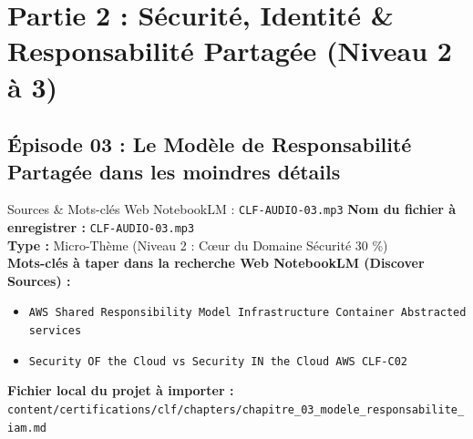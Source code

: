 \documentclass[11pt,a4paper]{article}
\begin{document}
\newpage

\section{Partie 2 : Sécurité, Identité \& Responsabilité Partagée (Niveau 2 à 3)}

\subsection{Épisode 03 : Le Modèle de Responsabilité Partagée dans les moindres détails}
\begin{sourcebox}{Sources \& Mots-clés Web NotebookLM : \texttt{CLF-AUDIO-03.mp3}}
\textbf{Nom du fichier à enregistrer :} \texttt{CLF-AUDIO-03.mp3}\\
\textbf{Type :} Micro-Thème (Niveau 2 : Cœur du Domaine Sécurité 30 \%)\\
\textbf{Mots-clés à taper dans la recherche Web NotebookLM (Discover Sources) :}
\begin{itemize}[noitemsep]
    \item \texttt{AWS Shared Responsibility Model Infrastructure Container Abstracted services}
    \item \texttt{Security OF the Cloud vs Security IN the Cloud AWS CLF-C02}
\end{itemize}
\textbf{Fichier local du projet à importer :}
\texttt{content/certifications/clf/chapters/chapitre_03_modele_responsabilite_iam.md}
\end{sourcebox}
\end{document}
